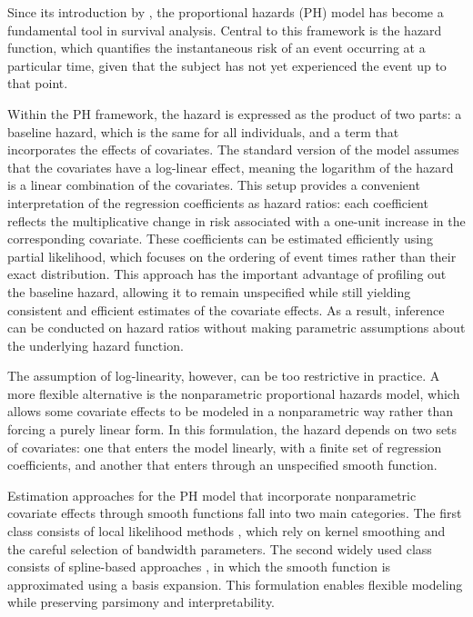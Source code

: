 \documentclass[11pt]{article}
\begin{document}
Since its introduction by \citep{Cox:1972}, the proportional hazards (PH) model has become a fundamental tool in survival analysis. Central to this framework is the hazard function, which quantifies the instantaneous risk of an event occurring at a particular time, given that the subject has not yet experienced the event up to that point.  

Within the PH framework, the hazard is expressed as the product of two parts: a baseline hazard, which is the same for all individuals, and a term that incorporates the effects of covariates. The standard version of the model assumes that the covariates have a log-linear effect, meaning the logarithm of the hazard is a linear combination of the covariates. This setup provides a convenient interpretation of the regression coefficients as hazard ratios: each coefficient reflects the multiplicative change in risk associated with a one-unit increase in the corresponding covariate. These coefficients can be estimated efficiently using partial likelihood, which focuses on the ordering of event times rather than their exact distribution. This approach has the important advantage of profiling out the baseline hazard, allowing it to remain unspecified while still yielding consistent and efficient estimates of the covariate effects. As a result, inference can be conducted on hazard ratios without making parametric assumptions about the underlying hazard function.  

The assumption of log-linearity, however, can be too restrictive in practice. A more flexible alternative is the nonparametric proportional hazards model, which allows some covariate effects to be modeled in a nonparametric way rather than forcing a purely linear form. In this formulation, the hazard depends on two sets of covariates: one that enters the model linearly, with a finite set of regression coefficients, and another that enters through an unspecified smooth function. %


Estimation approaches for the PH model that incorporate nonparametric covariate effects through smooth functions fall into two main categories. The first class consists of local likelihood methods \citep{tibshirani1987local, fan1997local, chen2010global}, which rely on kernel smoothing and the careful selection of bandwidth parameters. The second widely used class consists of spline-based approaches \citep{o1988nonparametric, hastie1990exploring, kooperberg1995hazard}, in which the smooth function is approximated using a basis expansion. This formulation enables flexible modeling while preserving parsimony and interpretability.
\end{document}
